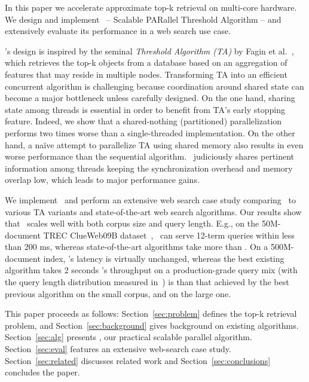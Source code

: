In this paper we accelerate approximate top-k retrieval on multi-core hardware. 
We design and implement  \emph{\alg}~-- {Scalable PARallel Threshold Algorithm} --  
 and extensively evaluate its performance in 
a web search use case. 

\alg's design is inspired by the seminal \emph{Threshold Algorithm (TA)} by Fagin et al.~\cite{Fagin:2003}, which
retrieves the top-k objects from a database based on an aggregation of features that may reside in multiple nodes. 
Transforming TA into an efficient concurrent algorithm is challenging because coordination around 
shared state can become a major bottleneck unless carefully designed. On the one hand,
sharing state among threads is essential in order to benefit from TA's early stopping feature.
Indeed, we show  that a shared-nothing (partitioned) parallelization  performs two times 
worse than a single-threaded implementation. On the other hand, 
a na\"ive attempt to parallelize TA using shared memory also results in even 
worse performance than the sequential algorithm. \alg\ judiciously shares pertinent
information among threads %
keeping the synchronization 
overhead and memory overlap low, which 
leads to major performance gains. 

We implement \alg\ and perform an extensive web search case study comparing \alg\ to various TA variants and 
state-of-the-art web search algorithms. 
Our results show that \alg\ scales well with both  corpus size and query length.
E.g., on the 50M-document TREC ClueWeb09B dataset~\cite{ClueWeb09}, 
\alg\ can serve  12-term queries within less than 200 ms, 
whereas 
state-of-the-art algorithms  take more than . 
%
On a 500M-document index,  \alg's latency is virtually unchanged, whereas 
the best existing algorithm
 takes 2 seconds  
 \alg's throughput on a production-grade query mix (with the query length distribution measured in~\cite{sigir/Guy16}) is 
 than that achieved by the best previous algorithm
 on the small corpus, and   on the large one.

This paper proceeds as follows: 
Section~\ref{sec:problem} defines the top-k retrieval problem, and  
Section~\ref{sec:background} gives background on existing algorithms. 
Section~\ref{sec:alg} presents \alg, our practical scalable parallel algorithm. 
Section~\ref{sec:eval}  features an extensive web-search case study.
Section~\ref{sec:related} discusses related work and Section~\ref{sec:conclusions} concludes the paper.
